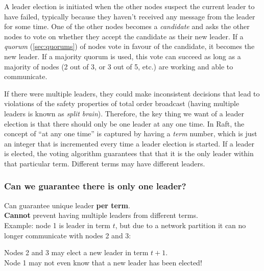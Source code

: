 A leader election is initiated when the other nodes suspect the current leader to have failed, typically because they haven't received any message from the leader for some time.
One of the other nodes becomes a \emph{candidate} and asks the other nodes to vote on whether they accept the candidate as their new leader.
If a \emph{quorum} (\autoref{sec:quorums}) of nodes vote in favour of the candidate, it becomes the new leader.
If a majority quorum is used, this vote can succeed as long as a majority of nodes (2 out of 3, or 3 out of 5, etc.) are working and able to communicate.

If there were multiple leaders, they could make inconsistent decisions that lead to violations of the safety properties of total order broadcast (having multiple leaders is known as \emph{split brain}).
Therefore, the key thing we want of a leader election is that there should only be one leader at any one time.
In Raft, the concept of ``at any one time'' is captured by having a \emph{term} number, which is just an integer that is incremented every time a leader election is started.
If a leader is elected, the voting algorithm guarantees that that it is the only leader within that particular term.
Different terms may have different leaders.

\begin{frame}
    \label{s:leader-uniqueness}
    \frametitle{Can we guarantee there is only one leader?}
    Can guarantee unique leader \textbf{per term}.\\[1em]\pause
    \textbf{Cannot} prevent having multiple leaders from different terms.\\[1em]\pause
    Example: node 1 is leader in term $t$, but due to a network partition it can no longer communicate with nodes 2 and 3:
    \begin{center}
    \end{center}
    Nodes 2 and 3 may elect a new leader in term $t+1$.\\[1em]\pause
    Node 1 may not even know that a new leader has been elected!
\end{frame}
\label{l:leader-uniqueness}

